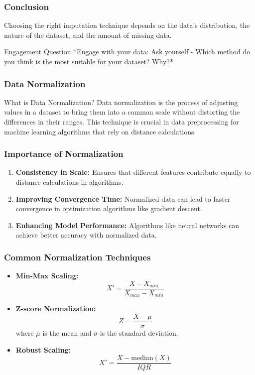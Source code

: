 \documentclass[aspectratio=169]{beamer}
\begin{document}
\begin{frame}[fragile]
    \frametitle{Conclusion}
    Choosing the right imputation technique depends on the data's distribution, the nature of the dataset, and the amount of missing data. 
    \begin{block}{Engagement Question}
        *Engage with your data: Ask yourself - Which method do you think is the most suitable for your dataset? Why?*
    \end{block}
\end{frame}

\begin{frame}[fragile]
    \frametitle{Data Normalization}
    \begin{block}{What is Data Normalization?}
        Data normalization is the process of adjusting values in a dataset to bring them into a common scale without distorting the differences in their ranges. This technique is crucial in data preprocessing for machine learning algorithms that rely on distance calculations.
    \end{block}
\end{frame}

\begin{frame}[fragile]
    \frametitle{Importance of Normalization}
    \begin{enumerate}
        \item \textbf{Consistency in Scale:} Ensures that different features contribute equally to distance calculations in algorithms.
        
        \item \textbf{Improving Convergence Time:} Normalized data can lead to faster convergence in optimization algorithms like gradient descent.
        
        \item \textbf{Enhancing Model Performance:} Algorithms like neural networks can achieve better accuracy with normalized data.
    \end{enumerate}
\end{frame}

\begin{frame}[fragile]
    \frametitle{Common Normalization Techniques}
    \begin{itemize}
        \item \textbf{Min-Max Scaling:}
        \[
        X' = \frac{X - X_{min}}{X_{max} - X_{min}}
        \]
        
        \item \textbf{Z-score Normalization:}
        \[
        Z = \frac{X - \mu}{\sigma}
        \]
        where \( \mu \) is the mean and \( \sigma \) is the standard deviation.
        
        \item \textbf{Robust Scaling:}
        \[
        X' = \frac{X - \text{median}(X)}{IQR}
        \]
    \end{itemize}
\end{frame}
\end{document}
